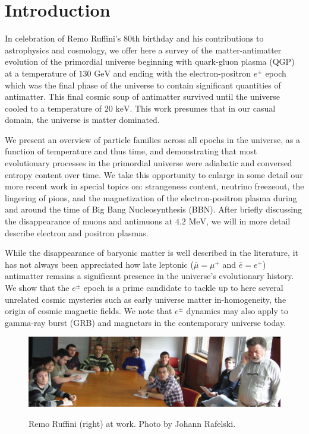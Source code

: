 \documentclass[Universe,article,submit,moreauthors,pdftex]{Definitions/mdpi}
\newcommand{\GeV}{\text{ GeV}}
\newcommand{\MeV}{\text{ MeV}}
\newcommand{\keV}{\text{ keV}}
\begin{document}
\section{Introduction}\label{sec:Intro}
\noindent In celebration of Remo Ruffini's 80th birthday and his contributions to astrophysics and cosmology, we offer here a survey of the matter-antimatter evolution of the primordial universe beginning with quark-gluon plasma (QGP) at a temperature of $130\GeV$ and ending with the electron-positron $e^{\pm}$ epoch which was the final phase of the universe to contain significant quantities of antimatter. This final cosmic soup of antimatter survived until the universe cooled to a temperature of $20\keV$. This work presumes that in our casual domain, the universe is matter dominated.

We present an overview of particle families across all epochs in the universe, as a function of temperature and thus time, and demonstrating that most evolutionary processes in the primordial universe were adiabatic and conversed entropy content over time. We take this opportunity to enlarge in some detail our more recent work in special topics on: strangeness content, neutrino freezeout, the lingering of pions, and the magnetization of the electron-positron plasma during and around the time of Big Bang Nucleosynthesis (BBN). After briefly discussing the disappearance of muons and antimuons at $4.2\MeV$, we will in more detail describe electron and positron plasmas.

While the disappearance of baryonic matter is well described in the literature, it has not always been appreciated how late leptonic ($\bar{\mu}=\mu^{+}$ and $\bar{e}=e^{+}$) antimatter remains a significant presence in the universe's evolutionary history. We show that the $e^{\pm}$ epoch is a prime candidate to tackle up to here several unrelated cosmic mysteries such as early universe matter in-homogeneity, the origin of cosmic magnetic fields. We note that $e^{\pm}$ dynamics may also apply to gamma-ray burst (GRB) and magnetars in the contemporary universe today.

\begin{figure}[htbp]
  \centering  \includegraphics[width=\textwidth]{12MarchRemoAtWorkC.jpg}
  \label{RemoAtWork}
  \caption{Remo Ruffini (right) at work. Photo by Johann Rafelski.}
\end{figure}
\end{document}
